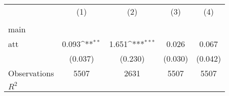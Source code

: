 {
\def\sym#1{\ifmmode^{#1}\else\(^{#1}\)\fi}
\begin{tabular}{l*{4}{c}}
\hline\hline
                    &\multicolumn{1}{c}{(1)}&\multicolumn{1}{c}{(2)}&\multicolumn{1}{c}{(3)}&\multicolumn{1}{c}{(4)}\\
                    &\multicolumn{1}{c}{} &\multicolumn{1}{c}{} &\multicolumn{1}{c}{} &\multicolumn{1}{c}{} \\
\hline
main                &                     &                     &                     &                     \\
att                 &       0.093\sym{**} &       1.651\sym{***}&       0.026         &       0.067         \\
                    &     (0.037)         &     (0.230)         &     (0.030)         &     (0.042)         \\
\hline
Observations        &        5507         &        2631         &        5507         &        5507         \\
\(R^{2}\)           &                     &                     &                     &                     \\
\hline\hline
\end{tabular}
}
